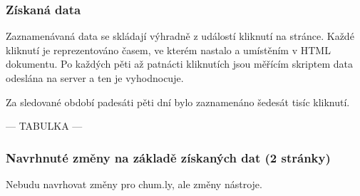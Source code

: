 \documentclass[bc,female,java,dept456]{diploma}						%
\begin{document}
\subsubsection{Získaná data}

Zaznamenávaná data se skládají výhradně z událostí kliknutí na stránce. Každé kliknutí je reprezentováno časem, ve kterém nastalo a umístěním v HTML dokumentu. Po každých pěti až patnácti kliknutích jsou měřícím skriptem data odeslána na server a ten je vyhodnocuje.

Za sledované období padesáti pěti dní bylo zaznamenáno šedesát tisíc kliknutí. 

--- TABULKA ---

\subsubsection{Navrhnuté změny na základě získaných dat (2 stránky)}

Nebudu navrhovat změny pro chum.ly, ale změny nástroje.
\end{document}
